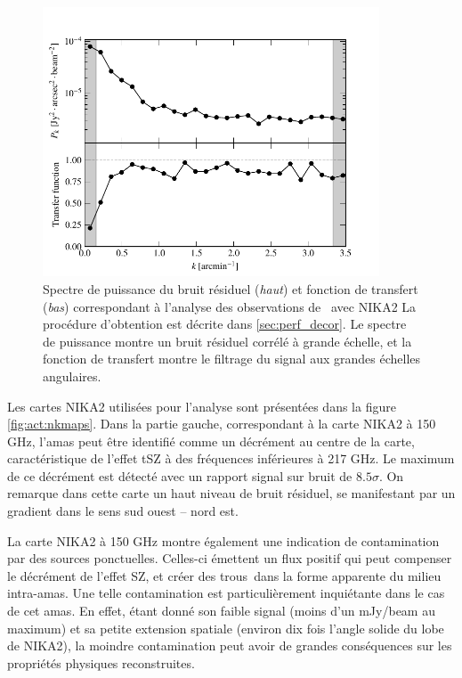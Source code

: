 \begin{figure}
    \centering
    \includegraphics[height=8cm, trim={0cm, 0cm, 0cm, 1cm}, clip]{Figures/Chap_actj0215/TF_noise.pdf}
    \caption{
        Spectre de puissance du bruit résiduel (\textit{haut}) et fonction de transfert (\textit{bas}) correspondant à l'analyse des observations de \act\ avec NIKA2
        La procédure d'obtention est décrite dans \ref{sec:perf_decor}.
        Le spectre de puissance montre un bruit résiduel corrélé à grande échelle, et la fonction de transfert montre le filtrage du signal aux grandes échelles angulaires.
    }
    \label{fig:act:tf_noise}
\end{figure}

Les cartes NIKA2 utilisées pour l'analyse sont présentées dans la figure \ref{fig:act:nkmaps}.
Dans la partie gauche, correspondant à la carte NIKA2 à 150 GHz, l'amas peut être identifié comme un décrément au centre de la carte, caractéristique de l'effet tSZ à des fréquences inférieures à 217 GHz.
Le maximum de ce décrément est détecté avec un rapport signal sur bruit de $8.5\sigma$.
On remarque dans cette carte un haut niveau de bruit résiduel, se manifestant par un gradient dans le sens sud ouest -- nord est.

La carte NIKA2 à 150 GHz montre également une indication de contamination par des sources ponctuelles.
Celles-ci émettent un flux positif qui peut compenser le décrément de l'effet SZ, et créer des trous\footnotemark\ dans la forme apparente du milieu intra-amas.
Une telle contamination est particulièrement inquiétante dans le cas de cet amas.
En effet, étant donné son faible signal (moins d'un mJy/beam au maximum) et sa petite extension spatiale (environ dix fois l'angle solide du lobe de NIKA2), la moindre contamination peut avoir de grandes conséquences sur les propriétés physiques reconstruites.

